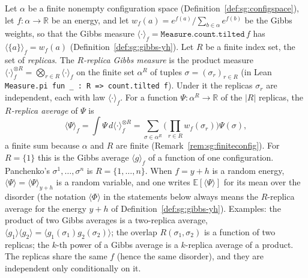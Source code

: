 \begin{definition}\label{def:sg:replica-average}
Let $\alpha$ be a finite nonempty configuration space (Definition~\ref{def:sg:configspace}), let $f:\alpha\to\mathbb R$ be an
energy, and let $w_f(a)=e^{f(a)}/\sum_{b\in\alpha}e^{f(b)}$ be the Gibbs weights, so that the Gibbs measure
$\langle\cdot\rangle_f=\texttt{Measure.count.tilted}\,f$ has $\langle\{a\}\rangle_f=w_f(a)$ (Definition~\ref{def:sg:gibbs-yh}).
Let $R$ be a finite index set, the set of \emph{replicas}. The \emph{$R$-replica Gibbs measure} is the product measure
$\langle\cdot\rangle_f^{\otimes R}=\bigotimes_{r\in R}\langle\cdot\rangle_f$ on the finite set $\alpha^R$ of tuples
$\sigma=(\sigma_r)_{r\in R}$ (in Lean \texttt{Measure.pi fun \_ : R => count.tilted f}). Under it the replicas $\sigma_r$ are
independent, each with law $\langle\cdot\rangle_f$. For a function $\Psi:\alpha^R\to\mathbb R$ of the $|R|$ replicas, the
\emph{$R$-replica average} of $\Psi$ is
\[\langle\Psi\rangle_f=\int\Psi\,d\langle\cdot\rangle_f^{\otimes R}=\sum_{\sigma\in\alpha^R}\Big(\prod_{r\in R}w_f(\sigma_r)\Big)\Psi(\sigma),\]
a finite sum because $\alpha$ and $R$ are finite (Remark~\ref{rem:sg:finiteconfig}). For $R=\{1\}$ this is the Gibbs average
$\langle g\rangle_f$ of a function of one configuration. Panchenko's $\sigma^1,\dots,\sigma^n$ is $R=\{1,\dots,n\}$. When $f=y+h$ is
a random energy, $\langle\Psi\rangle=\langle\Psi\rangle_{y+h}$ is a random variable, and one writes
$\mathbb E[\langle\Psi\rangle]$ for its mean over the disorder (the notation $\langle\Phi\rangle$ in the statements below
always means the $R$-replica average for the energy $y+h$ of Definition~\ref{def:sg:gibbs-yh}). Examples: the product of two Gibbs averages is a
two-replica average, $\langle g_1\rangle\langle g_2\rangle=\langle g_1(\sigma_1)g_2(\sigma_2)\rangle$; the overlap
$R(\sigma_1,\sigma_2)$ is a function of two replicas; the $k$-th power of a Gibbs average is a $k$-replica average of a
product. The replicas share the same $f$ (hence the same disorder), and they are independent only conditionally on it.
\end{definition}

